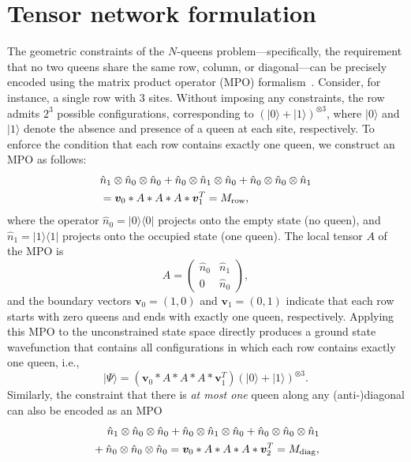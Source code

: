 \documentclass[aps, pre, reprint, amsmath, amssymb, superscriptaddress, floatfix]{revtex4-2}
\begin{document}
\section{Tensor network formulation}
\label{sec:tensor}
The geometric constraints of the $N$-queens problem---specifically,
the requirement that no two queens share the same row, column, or diagonal---can be
precisely encoded using the matrix product operator (MPO) formalism~\cite{Frowis2010}.
Consider, for instance, a single row with 3 sites. Without imposing any constraints,
the row admits $2^3$ possible configurations, corresponding to
$(|0\rangle + |1\rangle)^{\otimes 3}$, where $|0\rangle$ and
$|1\rangle$ denote the absence and presence of a queen at each site, respectively.
To enforce the condition that each row contains exactly one queen, we construct an MPO as follows:
\begin{align}
  & \hat{n}_1 \otimes \hat{n}_0 \otimes \hat{n}_0 
  + \hat{n}_0 \otimes \hat{n}_1 \otimes \hat{n}_0 
  + \hat{n}_0 \otimes \hat{n}_0 \otimes \hat{n}_1 \nonumber \\
  & =  \bm{v}_0 * A * A * A * \bm{v}_1^T = M_{\rm row},
\end{align}
where the operator $\hat{n}_0 = |0\rangle\langle 0|$ projects onto
the empty state (no queen), and $\hat{n}_1 = |1\rangle\langle 1|$
projects onto the occupied state (one queen). The local tensor $A$ of the MPO is
\begin{equation}
  A = \begin{pmatrix}
    \hat{n}_0 & \hat{n}_1 \\
    0         & \hat{n}_0  
  \end{pmatrix}, 
\end{equation}
and the boundary vectors $\bm{v}_0 = (1, 0)$ and $\bm{v}_1 = (0, 1)$
indicate that each row starts with zero queens and ends with exactly
one queen, respectively. Applying this MPO to the unconstrained state
space directly produces a ground state wavefunction that contains all
configurations in which each row contains exactly one queen, i.e.,
\begin{equation} 
|\Psi \rangle =  (\bm{v}_0 * A * A * A * \bm{v}_1^T) (|0\rangle + |1\rangle)^{\otimes 3}.
\end{equation}
Similarly, the constraint that there is \emph{at most one} queen along
any (anti-)diagonal can also be encoded as an MPO
\begin{align}
  &\,\,\,\,\,\,\,\, \hat{n}_1 \otimes \hat{n}_0 \otimes \hat{n}_0 
   + \hat{n}_0 \otimes \hat{n}_1 \otimes \hat{n}_0 
   + \hat{n}_0 \otimes \hat{n}_0 \otimes \hat{n}_1 \nonumber \\
 & + \hat{n}_0 \otimes \hat{n}_0 \otimes \hat{n}_0 =  \bm{v}_0 * A * A * A * \bm{v}_2^T = M_{\rm diag},
\end{align}
\end{document}
